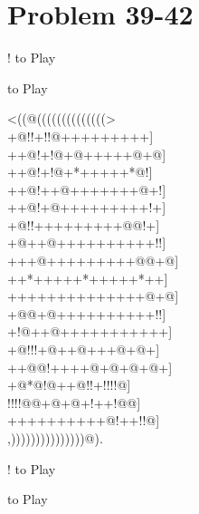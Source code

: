 \documentclass[mcrownvopaper,10pt,onecolumn,final]{memoir}
\begin{document}
\section{Problem 39-42}
\begin{minipage}[c]{0.5\linewidth}
    \hspace{8.3mm} {\gnos%
        !
    }
    to Play
\end{minipage}
\begin{minipage}[c]{0.5\linewidth}
    \hspace{27mm}{\gnos%
        !
    }
    to Play
\end{minipage}
\begin{minipage}[c]{\linewidth}
    \centering
    {\gnos%
          <((@((((((((((((((>\\
    +@!!+!!@+++++++++]\\
    ++@!+!@+@+++++@+@]\\
    ++@!+!@+*+++++*@!]\\
    ++@!++@+++++++@+!]\\
    ++@!+@+++++++++!+]\\
    +@!!+++++++++@@!+]\\
    +@++@++++++++++!!]\\
    +++@+++++++++@@+@]\\
    ++*+++++*+++++*++]\\
    ++++++++++++++@+@]\\
    +@@+@++++++++++!!]\\
    +!@++@+++++++++++]\\
    +@!!!+@++@+++@+@+]\\
    ++@@!++++@+@+@+@+]\\
    +@*@!@++@!!+!!!!@]\\
    !!!!@@+@+@+!++!@@]\\
    ++++++++++@!++!!@]\\
          ,)))))))))))))))@).\\
    }
\end{minipage}
\begin{minipage}[c]{0.5\linewidth}
    \hspace{8.3mm} {\gnos%
        !
    }
    to Play
\end{minipage}
\begin{minipage}[c]{0.5\linewidth}
    \hspace{27mm}{\gnos%
        !
    }
    to Play
\end{minipage}
\newpage
\end{document}
